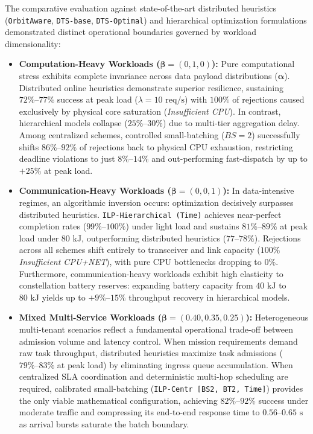 The comparative evaluation against state-of-the-art distributed heuristics (\texttt{OrbitAware}, \texttt{DTS-base}, \texttt{DTS-Optimal}) and hierarchical optimization formulations demonstrated distinct operational boundaries governed by workload dimensionality:

\begin{itemize}
    \item \textbf{Computation-Heavy Workloads ($\boldsymbol{\beta} = (0, 1, 0)$):} 
    Pure computational stress exhibits complete invariance across data payload distributions ($\boldsymbol{\alpha}$). Distributed online heuristics demonstrate superior resilience, sustaining $72\%\text{--}77\%$ success at peak load ($\lambda = 10\text{ req/s}$) with $100\%$ of rejections caused exclusively by physical core saturation (\textit{Insufficient CPU}). In contrast, hierarchical models collapse ($25\%\text{--}30\%$) due to multi-tier aggregation delay. Among centralized schemes, controlled small-batching ($BS=2$) successfully shifts $86\%\text{--}92\%$ of rejections back to physical CPU exhaustion, restricting deadline violations to just $8\%\text{--}14\%$ and out-performing fast-dispatch by up to $+25\%$ at peak load.

    \item \textbf{Communication-Heavy Workloads ($\boldsymbol{\beta} = (0, 0, 1)$):} 
    In data-intensive regimes, an algorithmic inversion occurs: optimization decisively surpasses distributed heuristics. \texttt{ILP-Hierarchical (Time)} achieves near-perfect completion rates ($99\%\text{--}100\%$) under light load and sustains $81\%\text{--}89\%$ at peak load under $80\text{ kJ}$, outperforming distributed heuristics ($77\text{--}78\%$). Rejections across all schemes shift entirely to transceiver and link capacity ($100\%$ \textit{Insufficient CPU+NET}), with pure CPU bottlenecks dropping to $0\%$. Furthermore, communication-heavy workloads exhibit high elasticity to constellation battery reserves: expanding battery capacity from $40\text{ kJ}$ to $80\text{ kJ}$ yields up to $+9\%\text{--}15\%$ throughput recovery in hierarchical models.

    \item \textbf{Mixed Multi-Service Workloads ($\boldsymbol{\beta} = (0.40, 0.35, 0.25)$):} 
    Heterogeneous multi-tenant scenarios reflect a fundamental operational trade-off between admission volume and latency control. When mission requirements demand raw task throughput, distributed heuristics maximize task admissions ($79\%\text{--}83\%$ at peak load) by eliminating ingress queue accumulation. When centralized SLA coordination and deterministic multi-hop scheduling are required, calibrated small-batching (\texttt{ILP-Centr [BS2, BT2, Time]}) provides the only viable mathematical configuration, achieving $82\%\text{--}92\%$ success under moderate traffic and compressing its end-to-end response time to $0.56\text{--}0.65\text{ s}$ as arrival bursts saturate the batch boundary.
\end{itemize}

